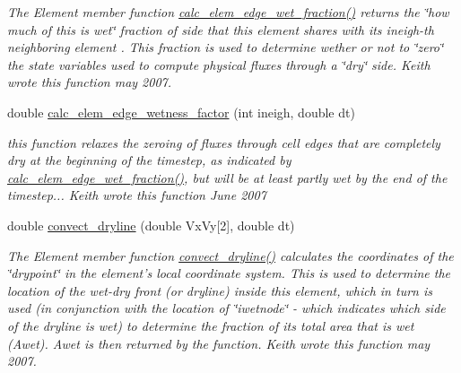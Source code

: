 \begin{CompactItemize}
\begin{CompactList}\small\item\em The Element member function \hyperlink{classElement_a130}{calc\_\-elem\_\-edge\_\-wet\_\-fraction()} returns the \char`\"{}how much of this is wet\char`\"{} fraction of side that this element shares with its ineigh-th neighboring element . This fraction is used to determine wether or not to \char`\"{}zero\char`\"{} the state variables used to compute physical fluxes through a \char`\"{}dry\char`\"{} side. Keith wrote this function may 2007. \item\end{CompactList}\item 
double \hyperlink{classElement_a131}{calc\_\-elem\_\-edge\_\-wetness\_\-factor} (int ineigh, double dt)
\begin{CompactList}\small\item\em this function relaxes the zeroing of fluxes through cell edges that are completely dry at the beginning of the timestep, as indicated by \hyperlink{classElement_a130}{calc\_\-elem\_\-edge\_\-wet\_\-fraction()}, but will be at least partly wet by the end of the timestep... Keith wrote this function June 2007 \item\end{CompactList}\item 
double \hyperlink{classElement_a132}{convect\_\-dryline} (double Vx\-Vy\mbox{[}2\mbox{]}, double dt)
\begin{CompactList}\small\item\em The Element member function \hyperlink{classElement_a132}{convect\_\-dryline()} calculates the coordinates of the \char`\"{}drypoint\char`\"{} in the element's local coordinate system. This is used to determine the location of the wet-dry front (or dryline) inside this element, which in turn is used (in conjunction with the location of \char`\"{}iwetnode\char`\"{} - which indicates which side of the dryline is wet) to determine the fraction of its total area that is wet (Awet). Awet is then returned by the function. Keith wrote this function may 2007. \item\end{CompactList}\end{CompactItemize}
